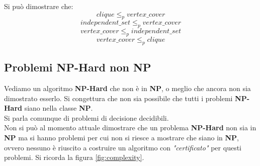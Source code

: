 							Si può dimostrare che:
							\[clique\leq_p vertex\_cover\]
							\[independent\_set\leq_p vertex\_cover\]
							\[vertex\_cover\leq_p independent\_set\]
							\[vertex\_cover\leq_p clique\]

\subsection{Problemi NP-Hard non NP}
										Vediamo un algoritmo \textbf{NP-Hard} che non è in \textbf{NP}, o meglio che
										ancora non sia dimostrato esserlo.
										Si congettura che non sia possibile che tutti i problemi \textbf{NP-Hard} siano
										nella classe \textbf{NP}.\\ 
										Si parla comunque di problemi di decisione decidibili.\\
										Non si può al momento attuale dimostrare che un problema \textbf{NP-Hard} non sia
										in \textbf{NP} ma si hanno problemi per cui non si riesce a mostrare che siano
										in \textbf{NP}, ovvero nessuno è riuscito a costruire un algoritmo con
										\textit{"certificato"} per questi problemi. Si ricorda la figura
										\ref{fig:complexity}.
